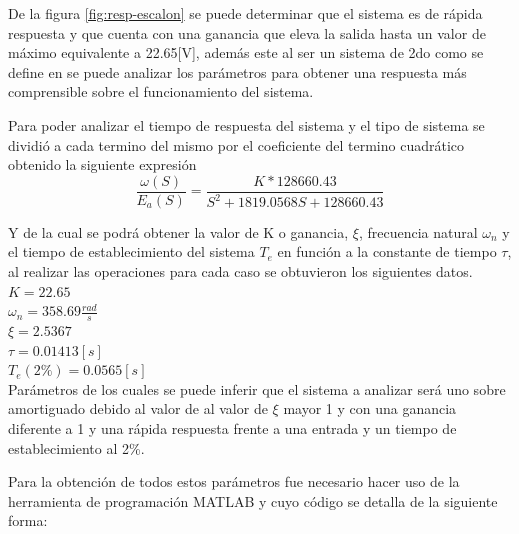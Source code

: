 \documentclass[conference]{IEEEtran}
\begin{document}
	De la figura \ref{fig:resp-escalon} se puede determinar que el sistema es de rápida respuesta y que cuenta con una ganancia que eleva la salida hasta un valor de máximo equivalente a 22.65[V], además este al ser un sistema de 2do como se define en \cite{ogata2015} se puede analizar los parámetros para obtener una respuesta más comprensible sobre el funcionamiento del sistema.
	
	Para poder analizar el tiempo de respuesta del sistema y el tipo de sistema se dividió a cada termino del mismo por el coeficiente del termino cuadrático obtenido la siguiente expresión
	\begin{equation}
		\frac{\omega(S)}{E_a(S)} = \frac{K*128660.43}{S^2 + 1819.0568S + 128660.43}
		\label{eq:ft-motor-reducida}
	\end{equation}
	
	Y de la cual se podrá obtener la valor de K o ganancia, $\xi$, frecuencia natural $\omega_n$ y el tiempo de establecimiento del sistema $T_e$ en función a la constante de tiempo $\tau$, al realizar las operaciones para cada caso se obtuvieron los siguientes datos. \\
	
	
	$K = 22.65$ \\
	$\omega_n = 358.69 \frac{rad}{s}$ \\
	$\xi = 2.5367$ \\
	$\tau = 0.01413 [s]$ \\
	$T_e (2\%)= 0.0565  [s]$ \\
	
	Parámetros de los cuales se puede inferir que el sistema a analizar será uno sobre amortiguado debido al valor de al valor de $\xi$ mayor 1 y con una ganancia diferente a 1 y una rápida respuesta frente a una entrada y un tiempo de establecimiento al 2\%.
	
	Para la obtención de todos estos parámetros fue necesario hacer uso de la herramienta de programación MATLAB y cuyo código se detalla de la siguiente forma:
	
	
\end{document}
